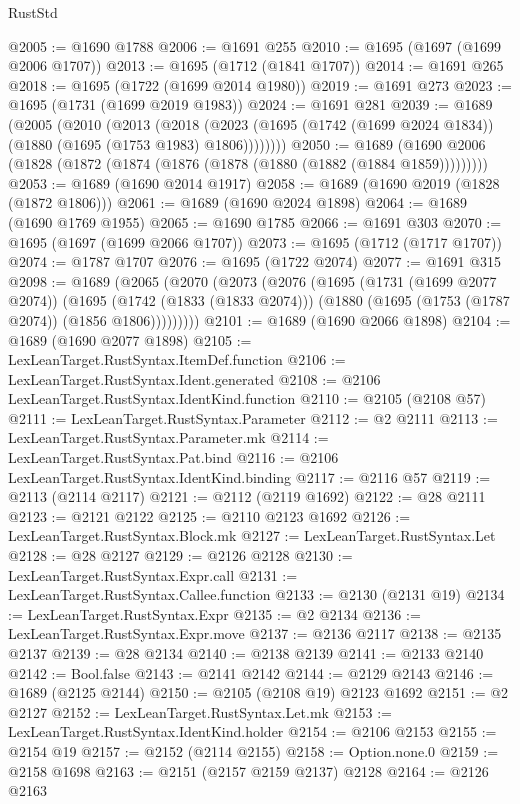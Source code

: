 \begin{lexlean}{RustStd}
\begin{coremodule}
@2005 := @1690 @1788
@2006 := @1691 @255
@2010 := @1695 (@1697 (@1699 @2006 @1707))
@2013 := @1695 (@1712 (@1841 @1707))
@2014 := @1691 @265
@2018 := @1695 (@1722 (@1699 @2014 @1980))
@2019 := @1691 @273
@2023 := @1695 (@1731 (@1699 @2019 @1983))
@2024 := @1691 @281
@2039 := @1689
    (@2005
      (@2010
        (@2013
          (@2018 (@2023 (@1695 (@1742 (@1699 @2024 @1834)) (@1880 (@1695 (@1753 @1983) @1806))))))))
@2050 := @1689 (@1690 @2006 (@1828 (@1872 (@1874 (@1876 (@1878 (@1880 (@1882 (@1884 @1859)))))))))
@2053 := @1689 (@1690 @2014 @1917)
@2058 := @1689 (@1690 @2019 (@1828 (@1872 @1806)))
@2061 := @1689 (@1690 @2024 @1898)
@2064 := @1689 (@1690 @1769 @1955)
@2065 := @1690 @1785
@2066 := @1691 @303
@2070 := @1695 (@1697 (@1699 @2066 @1707))
@2073 := @1695 (@1712 (@1717 @1707))
@2074 := @1787 @1707
@2076 := @1695 (@1722 @2074)
@2077 := @1691 @315
@2098 := @1689
    (@2065
      (@2070
        (@2073
          (@2076
            (@1695
              (@1731 (@1699 @2077 @2074))
              (@1695
                (@1742 (@1833 (@1833 @2074)))
                (@1880 (@1695 (@1753 (@1787 @2074)) (@1856 @1806)))))))))
@2101 := @1689 (@1690 @2066 @1898)
@2104 := @1689 (@1690 @2077 @1898)
@2105 := LexLeanTarget.RustSyntax.ItemDef.function
@2106 := LexLeanTarget.RustSyntax.Ident.generated
@2108 := @2106 LexLeanTarget.RustSyntax.IdentKind.function
@2110 := @2105 (@2108 @57)
@2111 := LexLeanTarget.RustSyntax.Parameter
@2112 := @2 @2111
@2113 := LexLeanTarget.RustSyntax.Parameter.mk
@2114 := LexLeanTarget.RustSyntax.Pat.bind
@2116 := @2106 LexLeanTarget.RustSyntax.IdentKind.binding
@2117 := @2116 @57
@2119 := @2113 (@2114 @2117)
@2121 := @2112 (@2119 @1692)
@2122 := @28 @2111
@2123 := @2121 @2122
@2125 := @2110 @2123 @1692
@2126 := LexLeanTarget.RustSyntax.Block.mk
@2127 := LexLeanTarget.RustSyntax.Let
@2128 := @28 @2127
@2129 := @2126 @2128
@2130 := LexLeanTarget.RustSyntax.Expr.call
@2131 := LexLeanTarget.RustSyntax.Callee.function
@2133 := @2130 (@2131 @19)
@2134 := LexLeanTarget.RustSyntax.Expr
@2135 := @2 @2134
@2136 := LexLeanTarget.RustSyntax.Expr.move
@2137 := @2136 @2117
@2138 := @2135 @2137
@2139 := @28 @2134
@2140 := @2138 @2139
@2141 := @2133 @2140
@2142 := Bool.false
@2143 := @2141 @2142
@2144 := @2129 @2143
@2146 := @1689 (@2125 @2144)
@2150 := @2105 (@2108 @19) @2123 @1692
@2151 := @2 @2127
@2152 := LexLeanTarget.RustSyntax.Let.mk
@2153 := LexLeanTarget.RustSyntax.IdentKind.holder
@2154 := @2106 @2153
@2155 := @2154 @19
@2157 := @2152 (@2114 @2155)
@2158 := Option.none.{0}
@2159 := @2158 @1698
@2163 := @2151 (@2157 @2159 @2137) @2128
@2164 := @2126 @2163

\end{coremodule}
\end{lexlean}
